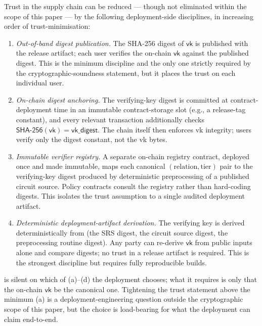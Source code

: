 \documentclass[11pt,a4paper]{article}
\theoremstyle{plain}
\theoremstyle{definition}
\begin{document}
Trust in the supply chain can be reduced --- though not
eliminated within the scope of this paper --- by the following
deployment-side disciplines, in increasing order of
trust-minimisation:
\begin{enumerate}[label=(\alph*),leftmargin=2em]
  \item \emph{Out-of-band digest publication.} The SHA-256
    digest of $\mathsf{vk}$ is published with the release
    artifact; each user verifies the on-chain $\mathsf{vk}$
    against the published digest. This is the minimum
    discipline and the only one strictly required by the
    cryptographic-soundness statement, but it places the trust
    on each individual user.
  \item \emph{On-chain digest anchoring.} The verifying-key
    digest is committed at contract-deployment time in an
    immutable contract-storage slot (e.g., a release-tag
    constant), and every relevant transaction additionally
    checks $\mathsf{SHA\text{-}256}(\mathsf{vk}) = \mathsf{vk\_digest}$.
    The chain itself then enforces vk integrity; users verify
    only the digest constant, not the vk bytes.
  \item \emph{Immutable verifier registry.} A separate
    on-chain registry contract, deployed once and made
    immutable, maps each canonical $(\text{relation}, \text{tier})$
    pair to the verifying-key digest produced by deterministic
    preprocessing of a published circuit source. Policy
    contracts consult the registry rather than hard-coding
    digests. This isolates the trust assumption to a single
    audited deployment artifact.
  \item \emph{Deterministic deployment-artifact derivation.}
    The verifying key is derived deterministically from
    (the SRS digest, the circuit source digest, the
    preprocessing routine digest). Any party can re-derive
    $\mathsf{vk}$ from public inputs alone and compare digests;
    no trust in a release artifact is required. This is the
    strongest discipline but requires fully reproducible
    builds.
\end{enumerate}
 is silent on which of (a)--(d) the deployment
chooses; what it requires is only that the on-chain $\mathsf{vk}$
be the canonical one. Tightening the trust statement above the
minimum (a) is a deployment-engineering question outside the
cryptographic scope of this paper, but the choice is
load-bearing for what the deployment can claim end-to-end.
\end{document}
